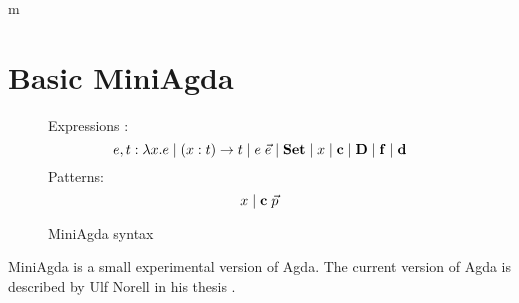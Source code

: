 m\chapter{Basic MiniAgda}

\newcommand{\dd}{\mathbf{d}}
\newcommand{\DD}{\mathbf{D}}
\newcommand{\cc}{\mathbf{c}}
\newcommand{\ff}{\mathbf{f}}

\begin{figure}[p]
\caption{MiniAgda syntax}
Expressions : \[e,t :  \lam x . e \vsp \EPi{x}{t}{t} \vsp e \; \vec{e} \vsp  \Set \vsp x \vsp \cc \vsp \DD \vsp \ff \vsp \dd\]
Patterns: \[ x  \vsp \cc \; \vec{p} \]
\end{figure}

MiniAgda is a small experimental version of Agda.
The current version of Agda is described by Ulf Norell in his thesis \cite{norell:thesis}.
